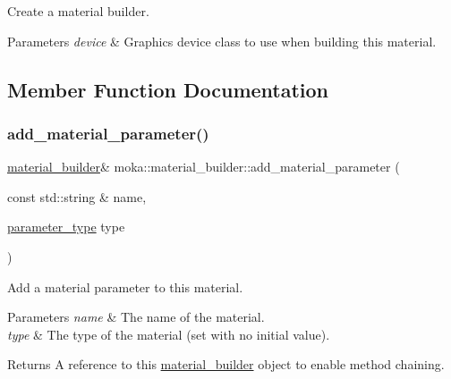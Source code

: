 Create a material builder. 


\begin{DoxyParams}{Parameters}
{\em device} & Graphics device class to use when building this material. \\
\hline
\end{DoxyParams}


\subsection{Member Function Documentation}
\mbox{\label{classmoka_1_1material__builder_af094ca99e624797eacc7e514a791e80b}} 
\subsubsection{\texorpdfstring{add\_material\_parameter()}{add\_material\_parameter()}\hspace{0.1cm}{\footnotesize\ttfamily [1/7]}}
{\footnotesize\ttfamily \mbox{\hyperlink{classmoka_1_1material__builder}{material\+\_\+builder}}\& moka\+::material\+\_\+builder\+::add\+\_\+material\+\_\+parameter (\begin{DoxyParamCaption}\item[{const std\+::string \&}]{name,  }\item[{\mbox{\hyperlink{namespacemoka_aed2224bc0e5b79e57a8975ded94ee1aa}{parameter\+\_\+type}}}]{type }\end{DoxyParamCaption})}



Add a material parameter to this material. 


\begin{DoxyParams}{Parameters}
{\em name} & The name of the material. \\
\hline
{\em type} & The type of the material (set with no initial value). \\
\hline
\end{DoxyParams}
\begin{DoxyReturn}{Returns}
A reference to this \mbox{\hyperlink{classmoka_1_1material__builder}{material\+\_\+builder}} object to enable method chaining. 
\end{DoxyReturn}
\mbox{\label{classmoka_1_1material__builder_af47cff3e8716c77c38f4db89afaa91b6}} 
